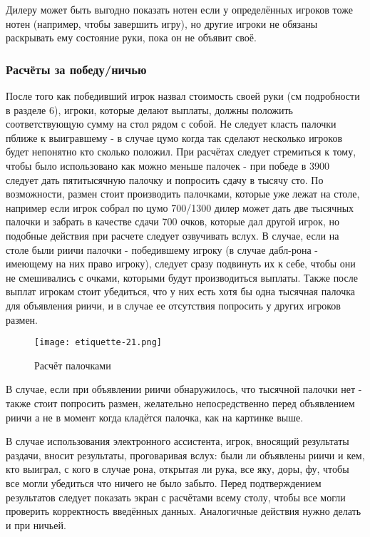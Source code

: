 Дилеру может быть выгодно показать нотен если у определённых игроков тоже нотен (например, чтобы завершить игру), но другие игроки не обязаны раскрывать ему состояние руки, пока он не объявит своё.

\subsubsection{Расчёты за победу/ничью}

После того как победивший игрок назвал стоимость своей руки (см подробности в разделе 6), игроки, которые делают выплаты, должны положить соответствующую сумму на стол рядом с собой. Не следует класть палочки пближе к выигравшему - в случае цумо когда так сделают несколько игроков будет непонятно кто сколько положил. При расчётах следует стремиться к тому, чтобы было использовано как можно меньше палочек - при победе в 3900 следует дать пятитысячную палочку и попросить сдачу в тысячу сто. По возможности, размен стоит производить палочками, которые уже лежат на столе, например если игрок собрал по цумо 700/1300 дилер может дать две тысячных палочки и забрать в качестве сдачи 700 очков, которые дал другой игрок, но подобные действия при расчете следует озвучивать вслух. В случае, если на столе были риичи палочки - победившему игроку (в случае дабл-рона - имеющему на них право игроку), следует сразу подвинуть их к себе, чтобы они не смешивались с очками, которыми будут производиться выплаты. Также после выплат игрокам стоит убедиться, что у них есть хотя бы одна тысячная палочка для объявления риичи, и в случае ее отсутствия попросить у других игроков размен.

\begin{figure}[H]
	\centering
	\texttt{[image: etiquette-21.png]}
	\caption{Расчёт палочками}
\end{figure}

В случае, если при объявлении риичи обнаружилось, что тысячной палочки нет - также стоит попросить размен, желательно непосредственно перед объявлением риичи а не в момент когда кладётся палочка, как на картинке выше.

В случае использования электронного ассистента, игрок, вносящий результаты раздачи, вносит результаты, проговаривая вслух: были ли объявлены риичи и кем, кто выиграл, с кого в случае рона, открытая ли рука, все яку, доры, фу, чтобы все могли убедиться что ничего не было забыто. Перед подтверждением результатов следует показать экран с расчётами всему столу, чтобы все могли проверить корректность введённых данных. Аналогичные действия нужно делать и при ничьей.

